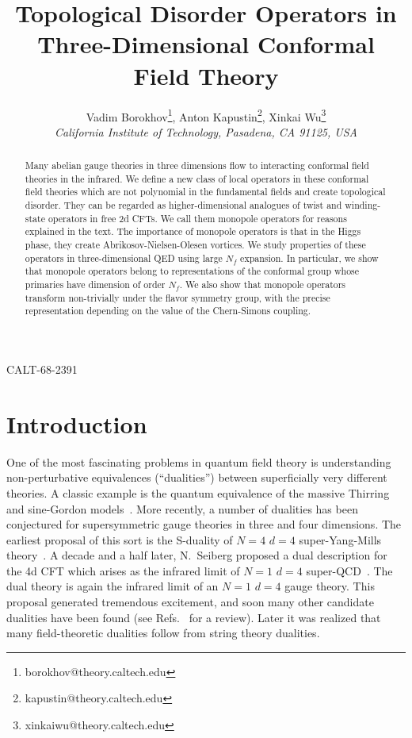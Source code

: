 \documentclass[a4paper,12pt, amsfonts, amssymb]{article}
\title{\bf \large Topological Disorder Operators in Three-Dimensional
Conformal Field Theory}
\author{Vadim Borokhov\thanks{borokhov@theory.caltech.edu}, Anton Kapustin\thanks{kapustin@theory.caltech.edu}, Xinkai Wu\thanks{xinkaiwu@theory.caltech.edu}\\
\it California Institute of Technology, Pasadena, CA 91125, USA
}
\begin{document}
\begin{titlepage}

\renewcommand{\thepage}{ }

\maketitle

\begin{abstract}

Many abelian gauge theories in three dimensions flow to interacting
conformal field theories in the infrared. We define a new class
of local operators in these conformal field theories which are not
polynomial in the fundamental fields and create
topological disorder. They can be regarded as higher-dimensional
analogues of twist and winding-state operators in free 2d CFTs. 
We call them monopole 
operators for reasons explained in the
text. The importance of monopole operators is that in the Higgs phase, 
they create Abrikosov-Nielsen-Olesen vortices. 
We study properties of these operators in three-dimensional QED using 
large $N_f$ expansion. In particular, we show that monopole operators
belong to representations of the conformal group whose primaries have
dimension of order $N_f$. We also show that monopole operators transform
non-trivially under the flavor symmetry group, with the precise representation
depending on the value of the Chern-Simons coupling.

\end{abstract}

\vspace{-6.5in}

\parbox{\linewidth}
{\small\hfill CALT-68-2391}

\end{titlepage}


\section{Introduction}

One of the most fascinating problems in quantum field theory is understanding
non-perturbative equivalences (``dualities'') between superficially
very different theories. A classic example is the quantum equivalence of the massive Thirring and sine-Gordon models~\cite{Coleman,Mandelstam}.
More recently, a number of dualities has been conjectured for supersymmetric
gauge theories in three and four dimensions. The earliest proposal of
this sort is the S-duality of $N=4$ $d=4$ super-Yang-Mills 
theory~\cite{MO,WO,Osborn}.
A decade and a half later, N.~Seiberg proposed a dual description for the 
4d CFT which arises as the infrared limit of $N=1$ $d=4$
super-QCD~\cite{Seiberg}. The dual theory is again the infrared limit of 
an $N=1$ $d=4$ gauge theory. 
This proposal generated tremendous excitement, and soon many other candidate dualities have been found (see Refs.~\cite{Peskin,CCM} for a review). 
Later it was realized that 
many field-theoretic dualities follow from string theory dualities.
\end{document}
